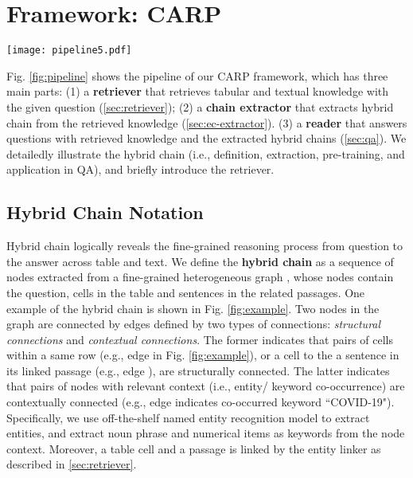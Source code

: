 \documentclass[11pt]{article}
\begin{document}
	\section{Framework: CARP}
	\begin{figure*}[thbp]
		\centering
		\texttt{[image: pipeline5.pdf]}
		\caption{Overview of our system. Retriever (\cref{sec:retriever}) first retrieves knowledge from the corpus for the question. 
		Secondly, hybrid chain extractor (\cref{sec:ec-extractor}) extracts hybrid chains from the knowledge, which is improved by pre-training (\cref{sec:ec-pretrain}). 
		Finally, reader (\cref{sec:qa}) answers the questions with retrieved evidence and extracted hybrid chain. }
		\label{fig:pipeline}
	\end{figure*}
	Fig. \ref{fig:pipeline} shows the pipeline of our CARP framework, which has three main parts: 
	(1) a \textbf{retriever} that retrieves tabular and textual knowledge with the given question (\cref{sec:retriever});
	(2) a \textbf{chain extractor} that extracts hybrid chain from the retrieved knowledge (\cref{sec:ec-extractor}).
	(3) a \textbf{reader} that answers questions with retrieved knowledge and the extracted hybrid chains (\cref{sec:qa}).
	We detailedly illustrate the hybrid chain (i.e., definition, extraction, pre-training, and application in QA), and briefly introduce the retriever.
	\subsection{Hybrid Chain Notation}
	Hybrid chain logically reveals the fine-grained reasoning process from question to the answer across table and text.
	We define the \textbf{hybrid chain} as a sequence of nodes extracted from a fine-grained heterogeneous graph  , whose nodes  contain the question, cells in the table and sentences in the related passages. 
One example of the hybrid chain is shown in Fig. \ref{fig:example}. 
	Two nodes in the graph are connected by edges  defined by two types of connections: \textit{structural connections} and \textit{contextual connections}. 
	The former indicates that pairs of cells within a same row (e.g., edge  in Fig. \ref{fig:example}), or a cell to the a sentence in its linked passage (e.g., edge ), are structurally connected. 
	The latter indicates that pairs of nodes with relevant context (i.e., entity/ keyword co-occurrence) are contextually connected (e.g., edge  indicates co-occurred keyword ``COVID-19").
	Specifically, we use off-the-shelf named entity recognition model \cite{Peters2017SemisupervisedST} to extract entities, and extract noun phrase and numerical items as keywords from the node context. Moreover, a table cell and a passage is linked by the entity linker as described in \cref{sec:retriever}.
\end{document}
